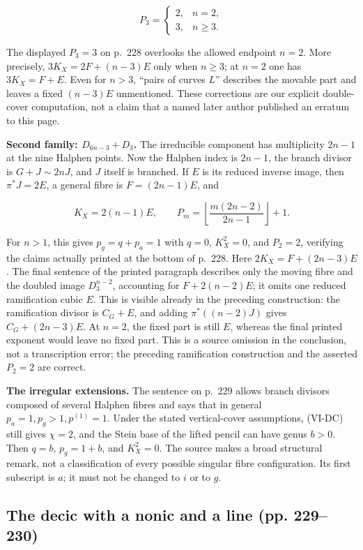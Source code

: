 \[
P_3=\begin{cases}2,&n=2,\\3,&n\geq3.\end{cases}
\]

The displayed \(P_3=3\) on p.~228 overlooks the allowed endpoint \(n=2\). More precisely, \(3K_X=2F+(n-3)E\) only when \(n\geq3\); at \(n=2\) one has \(3K_X=F+E\). Even for \(n>3\), ``pairs of curves \(L\)'' describes the movable part and leaves a fixed \((n-3)E\) unmentioned. These corrections are our explicit double-cover computation, not a claim that a named later author published an erratum to this page.

\textbf{Second family: \(D_{6n-3}+D_3\).} The irreducible component has multiplicity \(2n-1\) at the nine Halphen points. Now the Halphen index is \(2n-1\), the branch divisor is \(G+J\sim2nJ\), and \(J\) itself is branched. If \(E\) is its reduced inverse image, then \(\pi^*J=2E\), a general fibre is \(F=(2n-1)E\), and

\[
K_X=2(n-1)E,\qquad
P_m=\left\lfloor\frac{m(2n-2)}{2n-1}\right\rfloor+1.
\tag{VI-H2}
\]

For \(n>1\), this gives \(p_g=q+p_a=1\) with \(q=0\), \(K_X^2=0\), and \(P_2=2\), verifying the claims actually printed at the bottom of p.~228. Here \(2K_X=F+(2n-3)E\). The final sentence of the printed paragraph describes only the moving fibre and the doubled image \(D_3^{n-2}\), accounting for \(F+2(n-2)E\); it omits one reduced ramification cubic \(E\). This is visible already in the preceding construction: the ramification divisor is \(C_G+E\), and adding \(\pi^*((n-2)J)\) gives \(C_G+(2n-3)E\). At \(n=2\), the fixed part is still \(E\), whereas the final printed exponent would leave no fixed part. This is a source omission in the conclusion, not a transcription error; the preceding ramification construction and the asserted \(P_2=2\) are correct.

\textbf{The irregular extensions.} The sentence on p.~229 allows branch divisors composed of several Halphen fibres and says that in general \(p_a=1,p_g>1,p^{(1)}=1\). Under the stated vertical-cover assumptions, (VI-DC) still gives \(\chi=2\), and the Stein base of the lifted pencil can have genus \(b>0\). Then \(q=b\), \(p_g=1+b\), and \(K_X^2=0\). The source makes a broad structural remark, not a classification of every possible singular fibre configuration. Its first subscript is \(a\); it must not be changed to \(i\) or to \(g\).

\subsection{The decic with a nonic and a line (pp. 229--230)}

